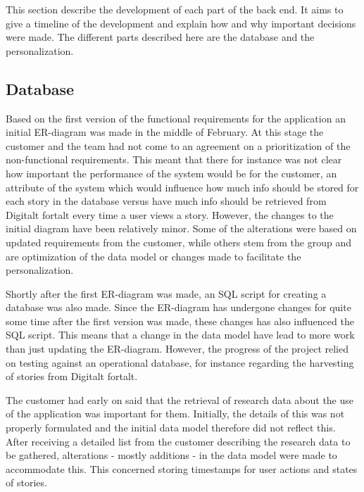 This section describe the development of each part of the back end. It aims to give a timeline of the development and explain how and why important decisions were made. The different parts described here are the database and the personalization. 

\subsection{Database}

Based on the first version of the functional requirements for the application an initial ER-diagram was made in the middle of February. At this stage the customer and the team had not come to an agreement on a prioritization of the non-functional requirements. This meant that there for instance was not clear how important the performance of the system would be for the customer, an attribute of the system which would influence how much info should be stored for each story in the database versus have much info should be retrieved from Digitalt fortalt every time a user views a story. However, the changes to the initial diagram have been relatively minor. Some of the alterations were based on updated requirements from the customer, while others stem from the group and are optimization of the data model or changes made to facilitate the personalization. \newline

Shortly after the first ER-diagram was made, an SQL script for creating a database was also made. Since the ER-diagram has undergone changes for quite some time after the first version was made, these changes has also influenced the SQL script. This means that a change in the data model have lead to more work than just updating the ER-diagram. However, the progress of the project relied on testing against an operational database, for instance regarding the harvesting of stories from Digitalt fortalt. \newline

The customer had early on said that the retrieval of research data about the use of the application was important for them. Initially, the details of this was not properly formulated and the initial data model therefore did not reflect this. After receiving a detailed list from the customer describing the research data to be gathered, alterations - mostly additions - in the data model were made to accommodate this. This concerned storing timestamps for user actions and states of stories.  \newline

